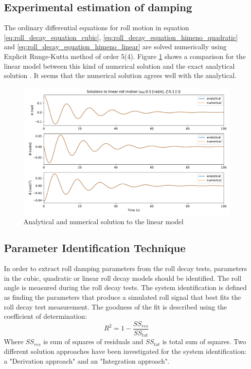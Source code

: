 \subsection{Experimental estimation of damping}
\label{se:experimental_estimation}

The ordinary differential equations for roll motion in equation \ref{eq:roll_decay_equation_cubic}, \ref{eq:roll_decay_equation_himeno_quadratic} and
\ref{eq:roll_decay_equation_himeno_linear} are solved numerically using Explicit Runge-Kutta method of order 5(4). Figure \ref{fig:analytical} shows a comparison for the linear model between this kind of numerical solution and the exact analytical solution \cite{henry_peter_piehl_ship_nodate}. It seems that the numerical solution agrees well with the analytical. 

\begin{figure}[h]
    \centering
    \includegraphics[width=\columnwidth]{figures/analytical.pdf}
    \caption{Analytical and numerical solution to the linear model}
    \label{fig:analytical}
\end{figure}


\subsection{Parameter Identification Technique}
\label{se:PIT}
In order to extract roll damping parameters from the roll decay tests, parameters in the cubic, quadratic or linear roll decay models should be identified. The roll angle is measured during the roll decay tests. The system identification is defined as finding the parameters that produce a simulated roll signal that best fits the roll decay test measurement. The goodness of the fit is described using the coefficient of determination:
\begin{equation} \label{eq:R2}
R^2=1-\frac{SS_{res}}{SS_{tot}}
\end{equation}
Where $SS_{res}$ is sum of squares of residuals and $SS_{tot}$ is total sum of squares. Two different solution approaches have been investigated for the system identification: a "Derivation approach" and an "Integration approach". 

